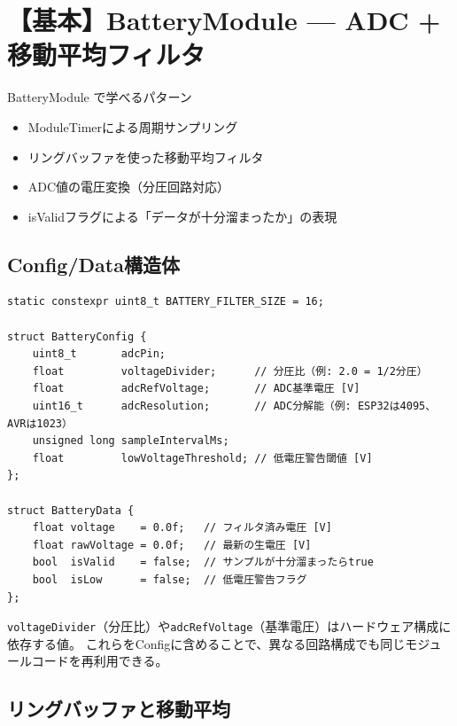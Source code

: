 \section{【基本】BatteryModule — ADC + 移動平均フィルタ}

\begin{patternbox}{BatteryModule で学べるパターン}
\begin{itemize}
    \item ModuleTimerによる周期サンプリング
    \item リングバッファを使った移動平均フィルタ
    \item ADC値の電圧変換（分圧回路対応）
    \item isValidフラグによる「データが十分溜まったか」の表現
\end{itemize}
\end{patternbox}

\subsection{Config/Data構造体}

\begin{lstlisting}[style=cppstyle, caption={BatteryModule.h — Config/Data}]
static constexpr uint8_t BATTERY_FILTER_SIZE = 16;

struct BatteryConfig {
    uint8_t       adcPin;
    float         voltageDivider;      // 分圧比（例: 2.0 = 1/2分圧）
    float         adcRefVoltage;       // ADC基準電圧 [V]
    uint16_t      adcResolution;       // ADC分解能（例: ESP32は4095、AVRは1023）
    unsigned long sampleIntervalMs;
    float         lowVoltageThreshold; // 低電圧警告閾値 [V]
};

struct BatteryData {
    float voltage    = 0.0f;   // フィルタ済み電圧 [V]
    float rawVoltage = 0.0f;   // 最新の生電圧 [V]
    bool  isValid    = false;  // サンプルが十分溜まったらtrue
    bool  isLow      = false;  // 低電圧警告フラグ
};
\end{lstlisting}

\begin{pointbox}[Configにハードウェア特性を含める]
\texttt{voltageDivider}（分圧比）や\texttt{adcRefVoltage}（基準電圧）はハードウェア構成に依存する値。
これらをConfigに含めることで、異なる回路構成でも同じモジュールコードを再利用できる。
\end{pointbox}

\subsection{リングバッファと移動平均}

